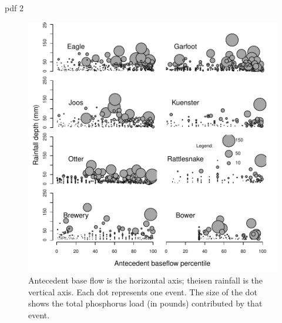 \documentclass[10pt]{article}
\begin{document}
\begin{Schunk}
\begin{Soutput}
pdf 
  2 
\end{Soutput}
\end{Schunk}

\begin{figure}
    \begin{center}
    \includegraphics[width=3inches]{ptot_bubbles}
    \end{center}
    \caption{Antecedent base flow is the horizontal axis; theisen rainfall is the vertical axis. Each dot represents one event. The size of the dot shows the total phosphorus load (in pounds) contributed by that event. \label{phos_bubbles}}
\end{figure}





\end{document}

